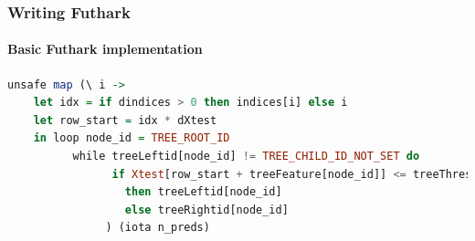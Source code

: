 \documentclass[12pt,t]{beamer}
\begin{document}
\begin{frame}[fragile]
  \frametitle{Writing Futhark}
  \framesubtitle{Basic Futhark implementation}
  \begin{minipage}{\textwidth}
  \begin{lstlisting}[language=Haskell, breaklines]
    unsafe map (\ i ->
    let idx = if dindices > 0 then indices[i] else i
    let row_start = idx * dXtest
    in loop node_id = TREE_ROOT_ID
          while treeLeftid[node_id] != TREE_CHILD_ID_NOT_SET do
                if Xtest[row_start + treeFeature[node_id]] <= treeThres_or_leaf[node_id]
                  then treeLeftid[node_id]
                  else treeRightid[node_id]
               ) (iota n_preds)
  \end{lstlisting}
  \end{minipage}
%
%
%
%
%

\end{frame}
\end{document}
